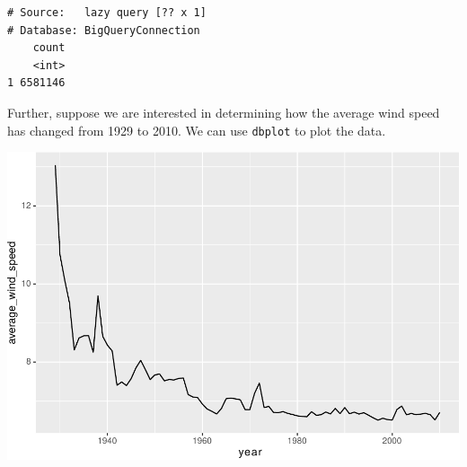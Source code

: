 \documentclass[]{krantz}
\makeatletter
\newenvironment{Shaded}{\begin{snugshade}}{\end{snugshade}}
\newcommand{\DataTypeTok}[1]{\textcolor[rgb]{0.27,0.27,0.27}{#1}}
\newcommand{\DecValTok}[1]{\textcolor[rgb]{0.06,0.06,0.06}{#1}}
\newcommand{\KeywordTok}[1]{\textcolor[rgb]{0.27,0.27,0.27}{\textbf{#1}}}
\newcommand{\NormalTok}[1]{#1}
\newcommand{\OperatorTok}[1]{\textcolor[rgb]{0.43,0.43,0.43}{\textbf{#1}}}
\newcommand{\OtherTok}[1]{\textcolor[rgb]{0.37,0.37,0.37}{#1}}
\newcommand{\StringTok}[1]{\textcolor[rgb]{0.5,0.5,0.5}{#1}}
\newenvironment{kframe}{%
\medskip{}
\setlength{\fboxsep}{.8em}
 \def\at@end@of@kframe{}%
 \ifinner\ifhmode%
  \def\at@end@of@kframe{\end{minipage}}%
  \begin{minipage}{\columnwidth}%
 \fi\fi%
 \def\FrameCommand##1{\hskip\@totalleftmargin \hskip-\fboxsep
 \colorbox{shadecolor}{##1}\hskip-\fboxsep
     \hskip-\linewidth \hskip-\@totalleftmargin \hskip\columnwidth}%
 \MakeFramed {\advance\hsize-\width
   \@totalleftmargin\z@ \linewidth\hsize
   \@setminipage}}%
 {\par\unskip\endMakeFramed%
 \at@end@of@kframe}
\renewenvironment{Shaded}{\begin{kframe}}{\end{kframe}}
\makeatother
\begin{document}
\begin{Shaded}
\end{Shaded}

\begin{verbatim}
# Source:   lazy query [?? x 1]
# Database: BigQueryConnection
    count
    <int>
1 6581146
\end{verbatim}

Further, suppose we are interested in determining how the average wind speed has changed from 1929 to 2010. We can use \texttt{dbplot} to plot the data.

\begin{Shaded}
\end{Shaded}

\includegraphics{bookdown_files/figure-latex/unnamed-chunk-304-1.pdf}
\end{document}
